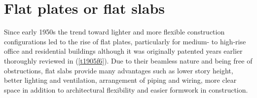 \section{Flat plates or flat slabs }
Since early 1950s the trend toward lighter and more flexible construction configurations led to the rise of flat plates, particularly for medium- to high-rise office and residential buildings\citep{Fema2741997} although it was originally patented years earlier\citep{usp1899,hill1900,usp1909,usp1925} thoroughly reviewed in \cite{gasparini2002contributions}(\ref{t1905f6}). Due to their beamless nature and being free of obstructions, flat slabs provide many advantages such as lower story height, better lighting and ventilation, arrangement of piping and wiring, more clear space in addition to architectural flexibility and easier formwork in construction. 

